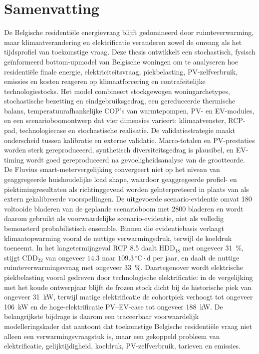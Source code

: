 \chapter*{Samenvatting}

De Belgische residentiële energievraag blijft gedomineerd door ruimteverwarming, maar klimaatverandering en elektrificatie veranderen zowel de omvang als het tijdsprofiel van toekomstige vraag. Deze thesis ontwikkelt een stochastisch, fysisch geïnformeerd bottom-upmodel van Belgische woningen om te analyseren hoe residentiële finale energie, elektriciteitsvraag, piekbelasting, PV-zelfverbruik, emissies en kosten reageren op klimaatforcering en contrafeitelijke technologiestocks. Het model combineert stockgewogen woningarchetypes, stochastische bezetting en eindgebruiksgedrag, een gereduceerde thermische balans, temperatuurafhankelijke COP’s van warmtepompen, PV- en EV-modules, en een scenarioboomontwerp dat vier dimensies varieert: klimaatvenster, RCP-pad, technologiecase en stochastische realisatie.
\newline De validatiestrategie maakt onderscheid tussen kalibratie en externe validatie. Macro-totalen en PV-prestaties worden sterk gereproduceerd, synthetisch diversiteitsgedrag is plausibel, en EV-timing wordt goed gereproduceerd na gevoeligheidsanalyse van de grootteorde. De Fluvius smart-metervergelijking convergeert niet op het niveau van geaggregeerde huishoudelijke load shape, waardoor geaggregeerde profiel- en piektimingresultaten als richtinggevend worden geïnterpreteerd in plaats van als extern gekalibreerde voorspellingen. De uitgevoerde scenario-evidentie omvat 180 voltooide bladeren van de geplande scenarioboom met 2800 bladeren en wordt daarom gebruikt als voorwaardelijke scenario-evidentie, niet als volledig bemonsterd probabilistisch ensemble.
\newline Binnen die evidentiebasis verlaagt klimaatopwarming vooral de nuttige verwarmingsdruk, terwijl de koeldruk toeneemt. In het langetermijngeval RCP 8.5 daalt HDD$_{18}$ met ongeveer \SI{31}{\percent}, stijgt CDD$_{22}$ van ongeveer $14.3$ naar $109.3\,^{\circ}\mathrm{C}\cdot\mathrm{d}$ per jaar, en daalt de nuttige ruimteverwarmingsvraag met ongeveer \SI{33}{\percent}. Daartegenover wordt elektrische piekbelasting vooral gedreven door technologische elektrificatie: in de vergelijking met het koude ontwerpjaar blijft de frozen stock dicht bij de historische piek van ongeveer \SI{31}{kW}, terwijl matige elektrificatie de cohortpiek verhoogt tot ongeveer \SI{106}{kW} en de hoge-elektrificatie PV--EV-case tot ongeveer \SI{188}{kW}. De belangrijkste bijdrage is daarom een traceerbaar voorwaardelijk modelleringskader dat aantoont dat toekomstige Belgische residentiële vraag niet alleen een verwarmingsvraagstuk is, maar een gekoppeld probleem van elektrificatie, gelijktijdigheid, koeldruk, PV-zelfverbruik, tarieven en emissies.

